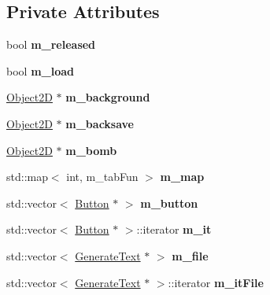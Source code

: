 \subsection*{Private Attributes}
\begin{DoxyCompactItemize}
\item 
\hypertarget{class_load_state_adf9a51d3ebc7dc178849396da6c4a64a}{}bool {\bfseries m\+\_\+released}\label{class_load_state_adf9a51d3ebc7dc178849396da6c4a64a}

\item 
\hypertarget{class_load_state_a3ef6b55fcf81c5ce201d2b22a3a1eebe}{}bool {\bfseries m\+\_\+load}\label{class_load_state_a3ef6b55fcf81c5ce201d2b22a3a1eebe}

\item 
\hypertarget{class_load_state_a2918d0b4edb6144d8f660fc82d154525}{}\hyperlink{class_object2_d}{Object2\+D} $\ast$ {\bfseries m\+\_\+background}\label{class_load_state_a2918d0b4edb6144d8f660fc82d154525}

\item 
\hypertarget{class_load_state_a326deaebfc444983b1e9e4de07768102}{}\hyperlink{class_object2_d}{Object2\+D} $\ast$ {\bfseries m\+\_\+backsave}\label{class_load_state_a326deaebfc444983b1e9e4de07768102}

\item 
\hypertarget{class_load_state_abadfd6f8c59dd75f502090eab57064f0}{}\hyperlink{class_object2_d}{Object2\+D} $\ast$ {\bfseries m\+\_\+bomb}\label{class_load_state_abadfd6f8c59dd75f502090eab57064f0}

\item 
\hypertarget{class_load_state_adfe1067fa32418d1f760e46a2cce6d26}{}std\+::map$<$ int, m\+\_\+tab\+Fun $>$ {\bfseries m\+\_\+map}\label{class_load_state_adfe1067fa32418d1f760e46a2cce6d26}

\item 
\hypertarget{class_load_state_a140e162b9894c508af0bb2d78fe92713}{}std\+::vector$<$ \hyperlink{class_button}{Button} $\ast$ $>$ {\bfseries m\+\_\+button}\label{class_load_state_a140e162b9894c508af0bb2d78fe92713}

\item 
\hypertarget{class_load_state_a92d0bfa23aed6137c7df8a66544491a4}{}std\+::vector$<$ \hyperlink{class_button}{Button} $\ast$ $>$\+::iterator {\bfseries m\+\_\+it}\label{class_load_state_a92d0bfa23aed6137c7df8a66544491a4}

\item 
\hypertarget{class_load_state_a78a9a1e495bd90e92ebea4bf36d448c4}{}std\+::vector$<$ \hyperlink{class_generate_text}{Generate\+Text} $\ast$ $>$ {\bfseries m\+\_\+file}\label{class_load_state_a78a9a1e495bd90e92ebea4bf36d448c4}

\item 
\hypertarget{class_load_state_a79d88f2f6528368bd73bf4c318867802}{}std\+::vector$<$ \hyperlink{class_generate_text}{Generate\+Text} $\ast$ $>$\+::iterator {\bfseries m\+\_\+it\+File}\label{class_load_state_a79d88f2f6528368bd73bf4c318867802}

\end{DoxyCompactItemize}

